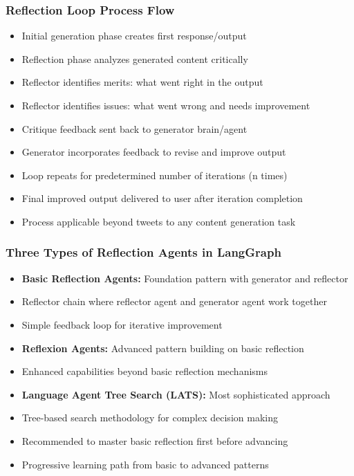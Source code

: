 \begin{frame}[fragile]\frametitle{Reflection Loop Process Flow}
      \begin{itemize}
        \item Initial generation phase creates first response/output
        \item Reflection phase analyzes generated content critically
        \item Reflector identifies merits: what went right in the output
        \item Reflector identifies issues: what went wrong and needs improvement
        \item Critique feedback sent back to generator brain/agent
        \item Generator incorporates feedback to revise and improve output
        \item Loop repeats for predetermined number of iterations (n times)
        \item Final improved output delivered to user after iteration completion
        \item Process applicable beyond tweets to any content generation task
      \end{itemize}
\end{frame}
\begin{frame}[fragile]\frametitle{Three Types of Reflection Agents in LangGraph}
      \begin{itemize}
        \item \textbf{Basic Reflection Agents:} Foundation pattern with generator and reflector
        \item Reflector chain where reflector agent and generator agent work together
        \item Simple feedback loop for iterative improvement
        \item \textbf{Reflexion Agents:} Advanced pattern building on basic reflection
        \item Enhanced capabilities beyond basic reflection mechanisms
        \item \textbf{Language Agent Tree Search (LATS):} Most sophisticated approach
        \item Tree-based search methodology for complex decision making
        \item Recommended to master basic reflection first before advancing
        \item Progressive learning path from basic to advanced patterns
      \end{itemize}
\end{frame}
